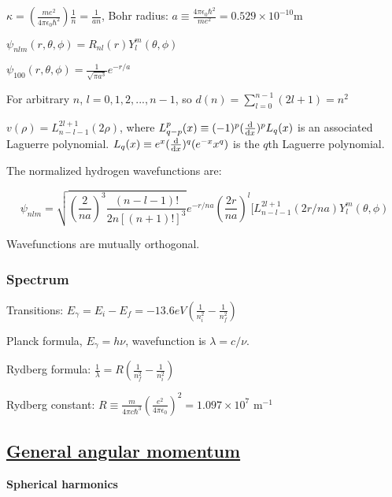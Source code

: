 $\kappa = (\frac{me^2}{4 \pi \epsilon_0 \hbar^2}) \frac{1}{n} = \frac{1}{an}$, Bohr radius: $a \equiv \frac{4 \pi \epsilon_0 \hbar^2}{me^2} = 0.529 \times 10^{-10} \textrm{m}$

$\psi_{nlm}(r, \theta, \phi) = R_{nl}(r) Y_l^m(\theta, \phi)$

$\psi_{100}(r, \theta, \phi) = \frac{1}{\sqrt{\pi a^3}} e^{-r/a}$

For arbitrary $n$, $l = 0, 1, 2, ..., n-1$, so $d(n) = \sum_{l=0}^{n-1} (2l+1) = n^2$

$v(\rho) = L_{n-l-1}^{2l+1} (2 \rho)$, where $L_{q-p}^p(x) \equiv (-1)^p (\dv{}{x})^p L_q (x)$ is an associated Laguerre polynomial. $L_q(x) \equiv e^x (\dv{}{x})^q (e^{-x} x^q)$ is the $q$th Laguerre polynomial.

The normalized hydrogen wavefunctions are:

$$\psi_{nlm} = \sqrt{(\frac{2}{na})^3 \frac{(n-l-1)!}{2n[(n+1)!]^3}} e^{-r/na} (\frac{2r}{na})^l [L_{n-l-1}^{2l+1} (2r/na) Y_l^m (\theta, \phi)$$

Wavefunctions are mutually orthogonal.

\subsubsection{Spectrum}

Transitions: $E_{\gamma} = E_i - E_f = -13.6 eV(\frac{1}{n_i^2} - \frac{1}{n_f^2})$

Planck formula, $E_{\gamma} = h \nu$, wavefunction is $\lambda = c / \nu$. 

Rydberg formula: $\frac{1}{\lambda} = R(\frac{1}{n^2_f} - \frac{1}{n^2_i})$

Rydberg constant: $R \equiv \frac{m}{4 \pi c \hbar^3} (\frac{e^2}{4 \pi \epsilon_0})^2 = 1.097 \times 10^7 \textrm{ m}^{-1}$

\subsection{\underline{General angular momentum}}


\textbf{Spherical harmonics}



